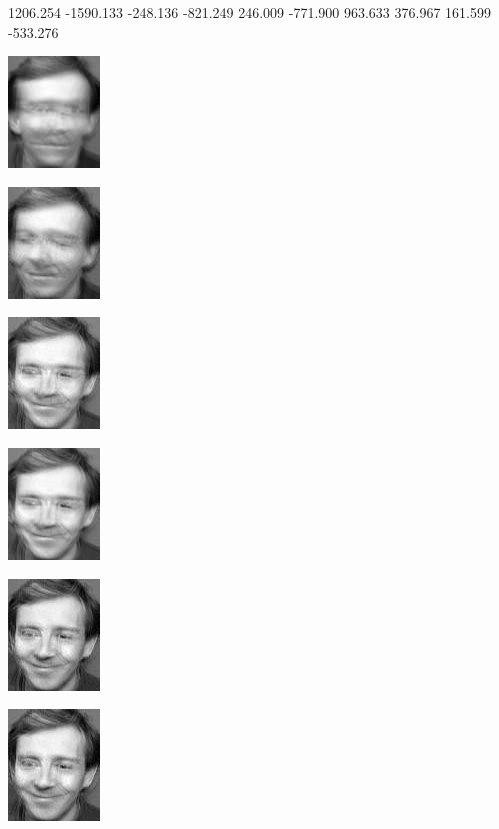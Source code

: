 \documentclass[a4paper]{article}
\begin{document}
1206.254 -1590.133 -248.136 -821.249 246.009 -771.900 963.633 376.967 161.599 -533.276

\includegraphics[scale=0.500000]{PartialReconstruction0.jpg}

\includegraphics[scale=0.500000]{PartialReconstruction1.jpg}

\includegraphics[scale=0.500000]{PartialReconstruction2.jpg}

\includegraphics[scale=0.500000]{PartialReconstruction3.jpg}

\includegraphics[scale=0.500000]{PartialReconstruction4.jpg}

\includegraphics[scale=0.500000]{PartialReconstruction5.jpg}
\end{document}
